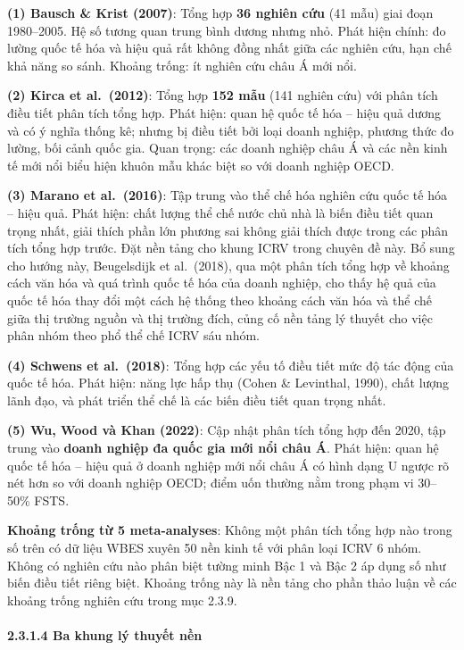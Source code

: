 \documentclass[
  a4paper,
  13pt]{extreport}
\begin{document}
\textbf{(1) Bausch \& Krist (2007)}: Tổng hợp \textbf{36 nghiên cứu} (41
mẫu) giai đoạn 1980--2005. Hệ số tương quan trung bình dương nhưng nhỏ.
Phát hiện chính: đo lường quốc tế hóa và hiệu quả rất không đồng nhất
giữa các nghiên cứu, hạn chế khả năng so sánh. Khoảng trống: ít nghiên
cứu châu Á mới nổi.

\textbf{(2) Kirca et al.~(2012)}: Tổng hợp \textbf{152 mẫu} (141 nghiên
cứu) với phân tích điều tiết phân tích tổng hợp. Phát hiện: quan hệ quốc
tế hóa -- hiệu quả dương và có ý nghĩa thống kê; nhưng bị điều tiết bởi
loại doanh nghiệp, phương thức đo lường, bối cảnh quốc gia. Quan trọng:
các doanh nghiệp châu Á và các nền kinh tế mới nổi biểu hiện khuôn mẫu
khác biệt so với doanh nghiệp OECD.

\textbf{(3) Marano et al.~(2016)}: Tập trung vào thể chế hóa nghiên cứu
quốc tế hóa -- hiệu quả. Phát hiện: chất lượng thể chế nước chủ nhà là
biến điều tiết quan trọng nhất, giải thích phần lớn phương sai không
giải thích được trong các phân tích tổng hợp trước. Đặt nền tảng cho
khung ICRV trong chuyên đề này. Bổ sung cho hướng này, Beugelsdijk et
al.~(2018), qua một phân tích tổng hợp về khoảng cách văn hóa và quá
trình quốc tế hóa của doanh nghiệp, cho thấy hệ quả của quốc tế hóa thay
đổi một cách hệ thống theo khoảng cách văn hóa và thể chế giữa thị
trường nguồn và thị trường đích, củng cố nền tảng lý thuyết cho việc
phân nhóm theo phổ thể chế ICRV sáu nhóm.

\textbf{(4) Schwens et al.~(2018)}: Tổng hợp các yếu tố điều tiết mức độ
tác động của quốc tế hóa. Phát hiện: năng lực hấp thụ (Cohen \&
Levinthal, 1990), chất lượng lãnh đạo, và phát triển thể chế là các biến
điều tiết quan trọng nhất.

\textbf{(5) Wu, Wood và Khan (2022)}: Cập nhật phân tích tổng hợp đến
2020, tập trung vào \textbf{doanh nghiệp đa quốc gia mới nổi châu Á}.
Phát hiện: quan hệ quốc tế hóa -- hiệu quả ở doanh nghiệp mới nổi châu Á
có hình dạng U ngược rõ nét hơn so với doanh nghiệp OECD; điểm uốn
thường nằm trong phạm vi 30--50\% FSTS.

\textbf{Khoảng trống từ 5 meta-analyses}: Không một phân tích tổng hợp
nào trong số trên có dữ liệu WBES xuyên 50 nền kinh tế với phân loại
ICRV 6 nhóm. Không có nghiên cứu nào phân biệt tường minh Bậc 1 và Bậc 2
áp dụng số như biến điều tiết riêng biệt. Khoảng trống này là nền tảng
cho phần thảo luận về các khoảng trống nghiên cứu trong mục 2.3.9.

\hypertarget{ba-khung-luxfd-thuyux1ebft-nux1ec1n}{%
\paragraph{2.3.1.4 Ba khung lý thuyết
nền}\label{ba-khung-luxfd-thuyux1ebft-nux1ec1n}}
\end{document}
